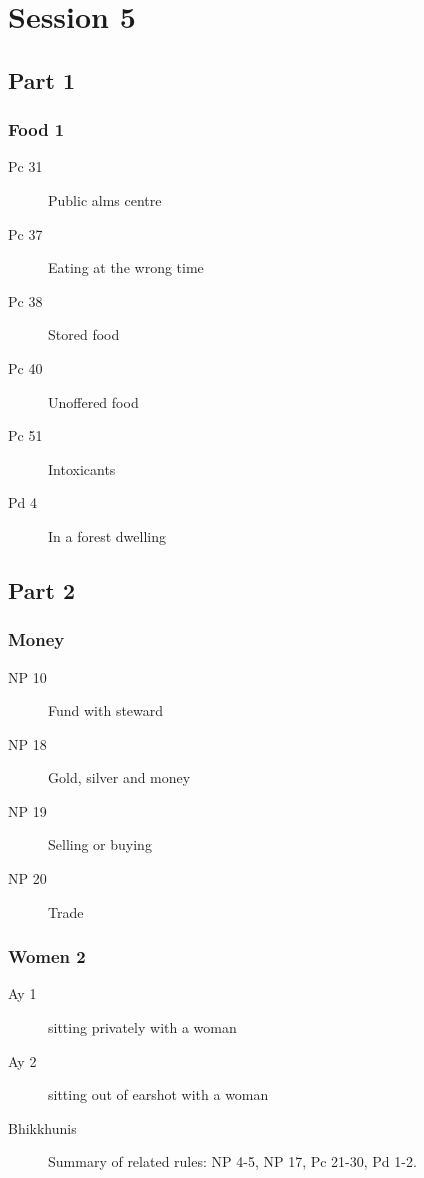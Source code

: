 \documentclass[11pt,oneside]{memoir}
\begin{document}
\chapter{Session 5}

\begin{multicols}{2}

\section{Part 1}

\subsection{Food 1}

\begin{description}
\item[Pc 31] Public alms centre
\item[Pc 37] Eating at the wrong time
\item[Pc 38] Stored food
\item[Pc 40] Unoffered food
\item[Pc 51] Intoxicants
\item[Pd 4] In a forest dwelling
\end{description}

\columnbreak

\section{Part 2}

\subsection{Money}

\begin{description}
\item[NP 10] Fund with steward
\item[NP 18] Gold, silver and money
\item[NP 19] Selling or buying
\item[NP 20] Trade
\end{description}

\subsection{Women 2}

\begin{description}
\item[Ay 1] sitting privately with a woman
\item[Ay 2] sitting out of earshot with a woman
\item[Bhikkhunis] Summary of related rules: NP 4-5, NP 17, Pc 21-30, Pd 1-2.
\end{description}

\end{multicols}
\end{document}
